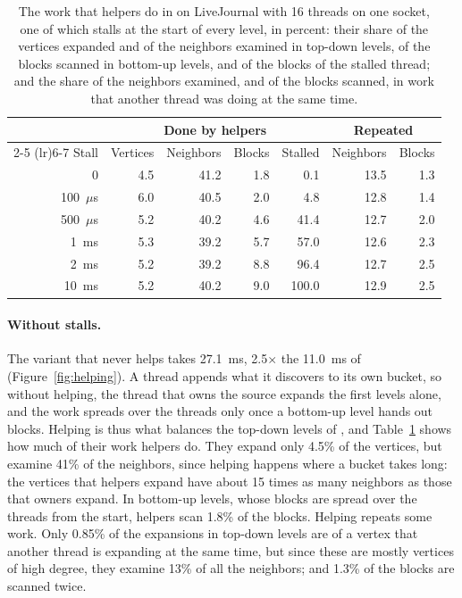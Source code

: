 \begin{table}
    \caption{The work that helpers do in \wfdo on LiveJournal with 16 threads on one socket, one of which stalls at the start of every level, in percent: their share of the vertices expanded and of the neighbors examined in top-down levels, of the blocks scanned in bottom-up levels, and of the blocks of the stalled thread; and the share of the neighbors examined, and of the blocks scanned, in work that another thread was doing at the same time.}
    \label{tab:helping}
    \small
    \setlength{\tabcolsep}{4pt}
    \begin{tabular}{r r r r r r r}
        \toprule
        & \multicolumn{4}{c}{Done by helpers} & \multicolumn{2}{c}{Repeated} \\
        \cmidrule(lr){2-5} \cmidrule(lr){6-7}
        Stall & Vertices & Neighbors & Blocks & Stalled & Neighbors & Blocks \\
        \midrule
        0 & 4.5 & 41.2 & 1.8 & 0.1 & 13.5 & 1.3 \\
        100~$\mu$s & 6.0 & 40.5 & 2.0 & 4.8 & 12.8 & 1.4 \\
        500~$\mu$s & 5.2 & 40.2 & 4.6 & 41.4 & 12.7 & 2.0 \\
        1~ms & 5.3 & 39.2 & 5.7 & 57.0 & 12.6 & 2.3 \\
        2~ms & 5.2 & 39.2 & 8.8 & 96.4 & 12.7 & 2.5 \\
        10~ms & 5.2 & 40.2 & 9.0 & 100.0 & 12.9 & 2.5 \\
        \bottomrule
    \end{tabular}
\end{table}

\paragraph{Without stalls.} The variant that never helps takes 27.1~ms, 2.5$\times$ the 11.0~ms of \wfdo (Figure~\ref{fig:helping}). A thread appends what it discovers to its own bucket, so without helping, the thread that owns the source expands the first levels alone, and the work spreads over the threads only once a bottom-up level hands out blocks. Helping is thus what balances the top-down levels of \wfdo, and Table~\ref{tab:helping} shows how much of their work helpers do. They expand only 4.5\% of the vertices, but examine 41\% of the neighbors, since helping happens where a bucket takes long: the vertices that helpers expand have about 15 times as many neighbors as those that owners expand. In bottom-up levels, whose blocks are spread over the threads from the start, helpers scan 1.8\% of the blocks. Helping repeats some work. Only 0.85\% of the expansions in top-down levels are of a vertex that another thread is expanding at the same time, but since these are mostly vertices of high degree, they examine 13\% of all the neighbors; and 1.3\% of the blocks are scanned twice.

